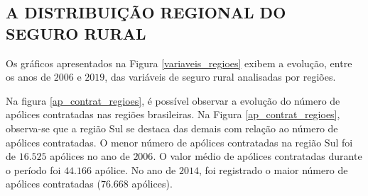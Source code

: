 \subsection{A DISTRIBUIÇÃO REGIONAL DO SEGURO RURAL} 

Os gráficos apresentados na Figura \ref{variaveis_regioes} exibem a evolução, entre os anos de $2006$ e $2019$, das variáveis de seguro rural analisadas por regiões.

Na figura \ref{ap_contrat_regioes}, é possível observar a evolução do número de apólices contratadas nas regiões brasileiras. Na Figura \ref{ap_contrat_regioes}, observa-se que a região Sul se destaca das demais com relação ao número de apólices contratadas. O menor número de apólices contratadas na região Sul foi de $16.525$ apólices no ano de $2006$. O valor médio de apólices contratadas durante o período foi $44.166$ apólice. No ano de $2014$, foi registrado o maior número de apólices contratadas ($76.668$ apólices). 

